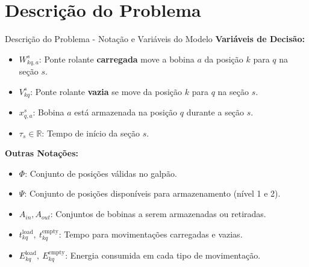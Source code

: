 \section{Descrição do Problema}

\begin{frame}{Descrição do Problema - Notação e Variáveis do Modelo}
\textbf{Variáveis de Decisão:}
\begin{itemize}
    \item $W^s_{kq,a}$: Ponte rolante \textbf{carregada} move a bobina $a$ da posição $k$ para $q$ na seção $s$.
    \item $V^s_{kq}$: Ponte rolante \textbf{vazia} se move da posição $k$ para $q$ na seção $s$.
    \item $x^s_{q,a}$: Bobina $a$ está armazenada na posição $q$ durante a seção $s$.
    \item $\tau_s \in \mathbb{R}$: Tempo de início da seção $s$.
\end{itemize}

\vspace{0.4cm}
\textbf{Outras Notações:}
\begin{itemize}
    \item $\Phi$: Conjunto de posições válidas no galpão.
    \item $\Psi$: Conjunto de posições disponíveis para armazenamento (nível 1 e 2).
    \item $A_{in}, A_{out}$: Conjuntos de bobinas a serem armazenadas ou retiradas.
    \item $t^{\text{load}}_{kq},\ t^{\text{empty}}_{kq}$: Tempo para movimentações carregadas e vazias.
    \item $E^{\text{load}}_{kq},\ E^{\text{empty}}_{kq}$: Energia consumida em cada tipo de movimentação.
\end{itemize}
\end{frame}



